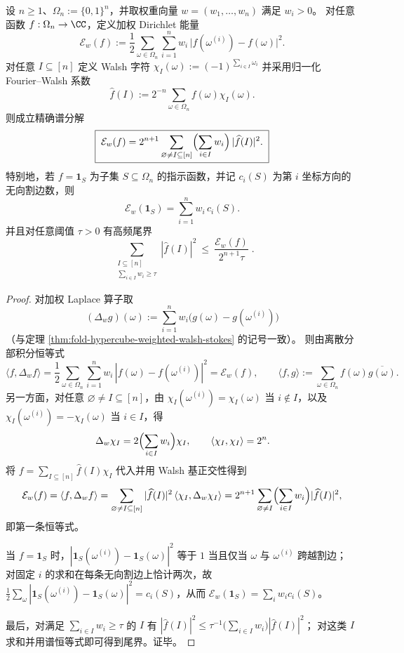 
\begin{theorem}\label{thm:fold-hypercube-weighted-stokes-sobolev-energy-spectrum}
设 \(n\ge 1\)、\(\Omega_n:=\{0,1\}^n\)，并取权重向量 \(w=(w_1,\dots,w_n)\) 满足 \(w_i>0\)。
对任意函数 \(f:\Omega_n\to\CC\)，定义加权 Dirichlet 能量
\[
\mathcal E_w(f)
:=\frac12\sum_{\omega\in\Omega_n}\sum_{i=1}^n w_i\,\bigl|f(\omega^{(i)})-f(\omega)\bigr|^2.
\]
对任意 \(I\subseteq[n]\) 定义 Walsh 字符 \(\chi_I(\omega):=(-1)^{\sum_{i\in I}\omega_i}\) 并采用归一化 Fourier--Walsh 系数
\[
\widehat f(I):=2^{-n}\sum_{\omega\in\Omega_n} f(\omega)\chi_I(\omega).
\]
则成立精确谱分解
\[
\boxed{\;
\mathcal E_w(f)
=2^{n+1}\sum_{\varnothing\neq I\subseteq[n]}\Bigl(\sum_{i\in I}w_i\Bigr)\,|\widehat f(I)|^2.\;}
\]
特别地，若 \(f=\mathbf 1_S\) 为子集 \(S\subseteq\Omega_n\) 的指示函数，并记 \(c_i(S)\) 为第 \(i\) 坐标方向的无向割边数，则
\[
\mathcal E_w(\mathbf 1_S)=\sum_{i=1}^n w_i\,c_i(S).
\]
并且对任意阈值 \(\tau>0\) 有高频尾界
\[
\boxed{\;
\sum_{\substack{I\subseteq[n]\\ \sum_{i\in I}w_i\ge \tau}}|\widehat f(I)|^2
\ \le\ \frac{\mathcal E_w(f)}{2^{n+1}\tau}\; }.
\]
\end{theorem}
\begin{proof}
对加权 Laplace 算子取
\[
(\Delta_w g)(\omega):=\sum_{i=1}^n w_i\bigl(g(\omega)-g(\omega^{(i)})\bigr)
\]
（与定理 \ref{thm:fold-hypercube-weighted-walsh-stokes} 的记号一致）。
则由离散分部积分恒等式
\[
\langle f,\Delta_w f\rangle
=\frac12\sum_{\omega\in\Omega_n}\sum_{i=1}^n w_i\,|f(\omega)-f(\omega^{(i)})|^2
=\mathcal E_w(f),
\qquad
\langle f,g\rangle:=\sum_{\omega\in\Omega_n} f(\omega)\overline{g(\omega)}.
\]
另一方面，对任意 \(\varnothing\neq I\subseteq[n]\)，由
\(
\chi_I(\omega^{(i)})=\chi_I(\omega)
\)
当 \(i\notin I\)，以及
\(
\chi_I(\omega^{(i)})=-\chi_I(\omega)
\)
当 \(i\in I\)，得
\[
\Delta_w\chi_I=2\Bigl(\sum_{i\in I}w_i\Bigr)\chi_I,
\qquad
\langle \chi_I,\chi_I\rangle=2^n.
\]
将 \(f=\sum_{I\subseteq[n]}\widehat f(I)\chi_I\) 代入并用 Walsh 基正交性得到
\[
\mathcal E_w(f)=\langle f,\Delta_w f\rangle
=\sum_{\varnothing\neq I\subseteq[n]}|\widehat f(I)|^2\,\langle \chi_I,\Delta_w\chi_I\rangle
=2^{n+1}\sum_{\varnothing\neq I}\Bigl(\sum_{i\in I}w_i\Bigr)|\widehat f(I)|^2,
\]
即第一条恒等式。
\par
当 \(f=\mathbf 1_S\) 时，\(|\mathbf 1_S(\omega^{(i)})-\mathbf 1_S(\omega)|^2\) 等于 \(1\) 当且仅当 \(\omega\) 与 \(\omega^{(i)}\) 跨越割边；
对固定 \(i\) 的求和在每条无向割边上恰计两次，故
\(
\frac12\sum_{\omega}|\mathbf 1_S(\omega^{(i)})-\mathbf 1_S(\omega)|^2=c_i(S)
\)，从而 \(\mathcal E_w(\mathbf 1_S)=\sum_i w_i c_i(S)\)。
\par
最后，对满足 \(\sum_{i\in I}w_i\ge\tau\) 的 \(I\) 有
\(
|\widehat f(I)|^2\le \tau^{-1}\bigl(\sum_{i\in I}w_i\bigr)|\widehat f(I)|^2
\)；
对这类 \(I\) 求和并用谱恒等式即可得到尾界。证毕。
\end{proof}

\endinput
